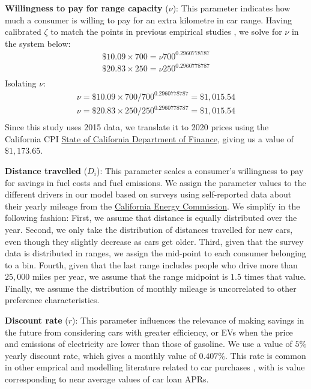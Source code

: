 \documentclass[12pt]{article}
\begin{document}
	\textbf{Willingness to pay for range capacity} ($\nu$): This parameter indicates how much a consumer is willing to pay for an extra kilometre in car range. Having calibrated $\zeta$ to match the points in previous empirical studies \citep{FERGUSON2018208}, we solve for $\nu$ in the system below:
	\begin{align}
		\$10.09 \times 700 = \nu 700^{0.2960778787}\\
		\$20.83 \times 250 = \nu 250^{0.2960778787}\\
	\end{align}
	Isolating $\nu$:
	\begin{align}
		\nu=\$10.09 \times 700 / 700^{0.2960778787} = \$1,015.54 \\
		\nu=\$20.83 \times 250 / 250^{0.2960778787} = \$1,015.54\\
	\end{align}
	Since this study uses 2015 data, we translate it to 
    2020 prices using the California CPI \href{https://dof.ca.gov/forecasting/economics/economic-indicators/inflation/}{State of California Department of Finance}, giving us a value of $\$1,173.65$.
	
	\textbf{Distance travelled} ($D_i$): This parameter scales a consumer's willingness to pay for savings in fuel costs and fuel emissions. We assign the parameter values to the different drivers in our model based on surveys using self-reported data about their yearly mileage from the \href{https://www.energy.ca.gov/data-reports/surveys/california-vehicle-survey/vehicle-miles-traveled-fuel-type}{California Energy Commission}. We simplify in the following fashion: First, we assume that distance is equally distributed over the year. Second, we only take the distribution of distances travelled for new cars, even though they slightly decrease as cars get older. Third, given that the survey data is distributed in ranges, we assign the mid-point to each consumer belonging to a bin. Fourth, given that the last range includes people who drive more than $25,000$ miles per year, we assume that the range midpoint is $1.5$ times that value. Finally, we assume the distribution of monthly mileage is uncorrelated to other preference characteristics. 
	
	\textbf{Discount rate} ($r$): This parameter influences the relevance of making savings in the future from considering cars with greater efficiency, or EVs when the price and emissions of electricity are lower than those of gasoline. We use a value of $5\%$ yearly discount rate, which gives a monthly value of $0.407\%$. This rate is common in other emprical and modelling literature related to car purchases \citep{woody2024electric, busse2013consumers, greene2010consumers}, with is value corresponding to near average values of car loan APRs.
	
\end{document}

